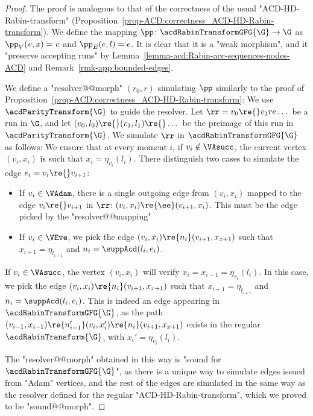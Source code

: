\documentclass{theoretics}
\begin{document}
\begin{proof}
	The proof is analogous to that of the correctness of the usual "ACD-HD-Rabin-transform" (Proposition~\ref{prop-ACD:correctness_ACD-HD-Rabin-transform}). We define the mapping $\pp\colon \acdRabinTransformGFG{\G} \to \G$ as $\pp_V(v,x) = v$ and $\pp_E(e,l) = e$. It is clear that it is a "weak morphism", and it "preserve accepting runs" by Lemma~\ref{lemma-acd:Rabin-acc-sequences-nodes-ACD} and Remark~\ref{rmk-app:bounded-edges}.
	
	We define a "resolver@@morph" $(r_0,r)$ simulating $\pp$ similarly to the proof of Proposition~\ref{prop-ACD:correctness_ACD-HD-Rabin-transform}: We use $\acdParityTransform{\G}$ to guide the resolver. Let $\rr = v_0\re{}v_1re{}\dots$ be a run in $\G$, and let $(v_0,l_0)\re{}(v_1,l_1)\re{}\dots$ be the preimage of this run in $\acdParityTransform{\G}$. We simulate $\rr$ in $\acdRabinTransformGFG{\G}$ as follows: We ensure that at every moment $i$, if $v_i\notin \VAsucc$, the current vertex $(v_i,x_i)$ is such that $x_i = \eta_{v_i}(l_i)$. There distinguish two cases to simulate the edge $e_i = v_i\re{}v_{i+1}$:
	\begin{itemize}
		\item If $v_i\in \VAdam$, there is a single outgoing edge from $(v_i,x_i)$ mapped to the edge $v_i\re{}v_{i+1}$ in $\rr$: $(v_i,x_i)\re{\ee}(v_{i+1},x_i)$. This must be the edge picked by the "resolver@@mapping"
		\item If $v_i\in \VEve$, we pick  the edge $(v_i,x_i)\re{n_i}(v_{i+1},x_{x+1})$ such that $x_{i+1} = \eta_{l_{i+1}}$ and $n_i = \suppAcd(l_i, e_i)$.
	\end{itemize} 
	If $v_i\in \VAsucc$, the vertex $(v_i,x_i)$ will verify $x_i = x_{i-1} = \eta_{v_i}(l_i)$. %
	In this case, we pick  the edge $(v_i,x_i)\re{n_i}(v_{i+1},x_{x+1})$ such that $x_{i+1} = \eta_{l_{i+1}}$  and $n_i = \suppAcd(l_i, e_i)$. This is indeed an edge appearing in $\acdRabinTransformGFG{\G}$, as the path $(v_{i-1},x_{i-1})\re{n_{i-1}'}(v_i,x_i')\re{n_i}(v_{i+1},x_{x+1})$ exists in the regular $\acdRabinTransform{\G}$, with $x_i' = \eta_{v_i}(l_i)$.
	
	The "resolver@@morph" obtained in this way is "sound for $\acdRabinTransformGFG{\G}$", as there is a unique way to simulate edges issued from "Adam" vertices, and the rest of the edges are simulated in the same way as the resolver defined for the regular "ACD-HD-Rabin-transform", which we proved to be "sound@@morph".
\end{proof}
 
\end{document}
